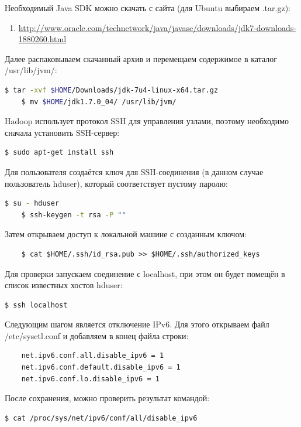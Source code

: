 \documentclass[12pt,a4paper]{extarticle} %
\begin{document}
\noindent Необходимый Java SDK можно скачать с сайта (для Ubuntu выбираем .tar.gz):
\begin{enumerate}
    \item[] \href{http://www.oracle.com/technetwork/java/javase/downloads/jdk7-downloads-1880260.html}{http://www.oracle.com/technetwork/java/javase/downloads/jdk7-downloads-1880260.html}
\end{enumerate}

\noindent Далее распаковываем скачанный архив и перемещаем содержимое в каталог /usr/lib/jvm/:
\begin{lstlisting}[language=sh]
    $ tar -xvf $HOME/Downloads/jdk-7u4-linux-x64.tar.gz
    $ mv $HOME/jdk1.7.0_04/ /usr/lib/jvm/
\end{lstlisting}

\noindent Hadoop использует протокол SSH для управления узлами, поэтому необходимо сначала установить SSH-сервер:
\begin{lstlisting}[language=sh]
    $ sudo apt-get install ssh
\end{lstlisting}

\noindent Для пользователя создаётся ключ для SSH-соединения (в данном случае пользователь hduser), который соответствует пустому паролю:
\begin{lstlisting}[language=sh]
    $ su - hduser
    $ ssh-keygen -t rsa -P ""
\end{lstlisting}

\noindent Затем открываем доступ к локальной машине с созданным ключом:
\begin{lstlisting}
    $ cat $HOME/.ssh/id_rsa.pub >> $HOME/.ssh/authorized_keys
\end{lstlisting}

\noindent Для проверки запускаем соединение с localhost, при этом он будет помещён в список известных хостов hduser:
\begin{lstlisting}[language=sh]
    $ ssh localhost
\end{lstlisting}

\noindent Следующим шагом является отключение IPv6. Для этого открываем файл /etc/sysctl.conf и добавляем в конец файла строки:
\begin{lstlisting}
    net.ipv6.conf.all.disable_ipv6 = 1
    net.ipv6.conf.default.disable_ipv6 = 1
    net.ipv6.conf.lo.disable_ipv6 = 1
\end{lstlisting}

\noindent После сохранения, можно проверить результат командой:
\begin{lstlisting}[language=sh]
    $ cat /proc/sys/net/ipv6/conf/all/disable_ipv6
\end{lstlisting}
\end{document}
